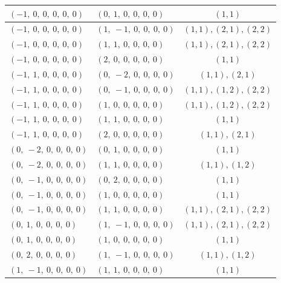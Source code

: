 \documentclass[11pt]{article}
\theoremstyle{definition}
\begin{document}
\begin{center}
\begin{tabular}{|l|l|c|}
    $\left( -1, \  0, \  0, \  0, \  0, \  0\right)$ & $\left( 0, \  1, \  0, \  0, \  0, \  0\right)$ & $(1,1)$ \\
    \hline
    $\left( -1, \  0, \  0, \  0, \  0, \  0\right)$ & $\left( 1, \  -1, \  0, \  0, \  0, \  0\right)$ & $(1,1), (2,1), (2,2)$ \\
    \hline
    $\left( -1, \  0, \  0, \  0, \  0, \  0\right)$ & $\left( 1, \  1, \  0, \  0, \  0, \  0\right)$ & $(1,1), (2,1), (2,2)$ \\
    \hline
    $\left( -1, \  0, \  0, \  0, \  0, \  0\right)$ & $\left( 2, \  0, \  0, \  0, \  0, \  0\right)$ & $(1,1)$ \\
    \hline
    $\left( -1, \  1, \  0, \  0, \  0, \  0\right)$ & $\left( 0, \  -2, \  0, \  0, \  0, \  0\right)$ & $(1,1), (2,1)$ \\
    \hline
    $\left( -1, \  1, \  0, \  0, \  0, \  0\right)$ & $\left( 0, \  -1, \  0, \  0, \  0, \  0\right)$ & $(1,1), (1,2), (2,2)$ \\
    \hline
    $\left( -1, \  1, \  0, \  0, \  0, \  0\right)$ & $\left( 1, \  0, \  0, \  0, \  0, \  0\right)$ & $(1,1), (1,2), (2,2)$ \\
    \hline
    $\left( -1, \  1, \  0, \  0, \  0, \  0\right)$ & $\left( 1, \  1, \  0, \  0, \  0, \  0\right)$ & $(1,1)$ \\
    \hline
    $\left( -1, \  1, \  0, \  0, \  0, \  0\right)$ & $\left( 2, \  0, \  0, \  0, \  0, \  0\right)$ & $(1,1), (2,1)$ \\
    \hline
    $\left( 0, \  -2, \  0, \  0, \  0, \  0\right)$ & $\left( 0, \  1, \  0, \  0, \  0, \  0\right)$ & $(1,1)$ \\
    \hline
    $\left( 0, \  -2, \  0, \  0, \  0, \  0\right)$ & $\left( 1, \  1, \  0, \  0, \  0, \  0\right)$ & $(1,1), (1,2)$ \\
    \hline
    $\left( 0, \  -1, \  0, \  0, \  0, \  0\right)$ & $\left( 0, \  2, \  0, \  0, \  0, \  0\right)$ & $(1,1)$ \\
    \hline
    $\left( 0, \  -1, \  0, \  0, \  0, \  0\right)$ & $\left( 1, \  0, \  0, \  0, \  0, \  0\right)$ & $(1,1)$ \\
    \hline
    $\left( 0, \  -1, \  0, \  0, \  0, \  0\right)$ & $\left( 1, \  1, \  0, \  0, \  0, \  0\right)$ & $(1,1), (2,1), (2,2)$ \\
    \hline
    $\left( 0, \  1, \  0, \  0, \  0, \  0\right)$ & $\left( 1, \  -1, \  0, \  0, \  0, \  0\right)$ & $(1,1), (2,1), (2,2)$ \\
    \hline
    $\left( 0, \  1, \  0, \  0, \  0, \  0\right)$ & $\left( 1, \  0, \  0, \  0, \  0, \  0\right)$ & $(1,1)$ \\
    \hline
    $\left( 0, \  2, \  0, \  0, \  0, \  0\right)$ & $\left( 1, \  -1, \  0, \  0, \  0, \  0\right)$ & $(1,1), (1,2)$ \\
    \hline
    $\left( 1, \  -1, \  0, \  0, \  0, \  0\right)$ & $\left( 1, \  1, \  0, \  0, \  0, \  0\right)$ & $(1,1)$ \\
    \hline
\end{tabular}
\end{center}
\end{document}
